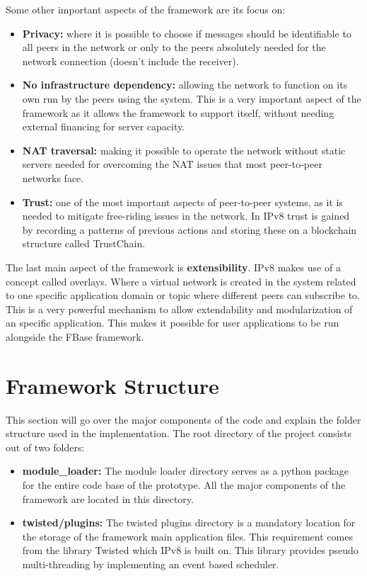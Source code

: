 Some other important aspects of the framework are its focus on:
\begin{itemize}
	\item \textbf{Privacy:} where it is possible to choose if messages should be identifiable to all peers in the network or only to the peers absolutely needed for the network connection (doesn't include the receiver). 
	\item \textbf{No infrastructure dependency:} allowing the network to function on its own run by the peers using the system. This is a very important aspect of the framework as it allows the framework to support itself, without needing external financing for server capacity.
	\item \textbf{NAT traversal:} making it possible to operate the network without static servers needed for overcoming the NAT issues that most peer-to-peer networks face.
	\item \textbf{Trust:} one of the most important aspects of peer-to-peer systems, as it is needed to mitigate free-riding issues in the network. In IPv8 trust is gained by recording a patterns of previous actions and storing these on a blockchain structure called TrustChain.
\end{itemize}

The last main aspect of the framework is \textbf{extensibility}. IPv8 makes use of a concept called overlays. Where a virtual network is created in the system related to one specific application domain or topic where different peers can subscribe to. This is a very powerful mechanism to allow extendability and modularization of an specific application. This makes it possible for user applications to be run alongside the FBase framework.

\section{Framework Structure}

This section will go over the major components of the code and explain the folder structure used in the implementation. The root directory of the project consists out of two folders:
\begin{itemize}
	\item \textbf{module\_loader:} The module loader directory serves as a python package for the entire code base of the prototype. All the major components of the framework are located in this directory.
	\item \textbf{twisted/plugins:} The twisted plugins directory is a mandatory location for the storage of the framework main application files. This requirement comes from the library Twisted which IPv8 is built on. This library provides pseudo multi-threading by implementing an event based scheduler.
\end{itemize}

